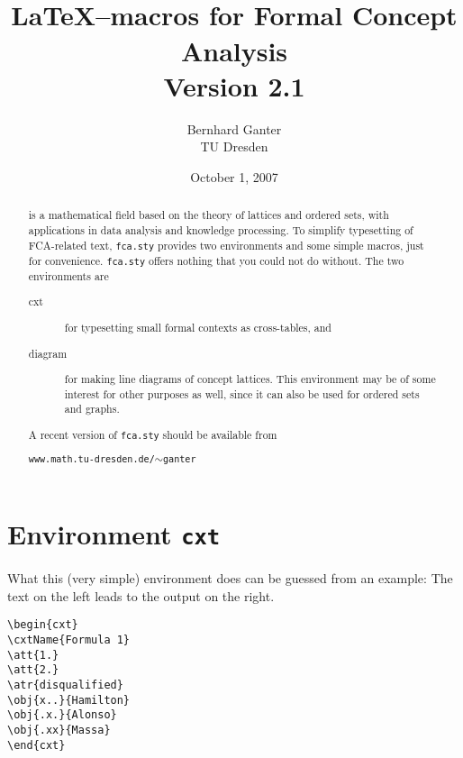 \documentclass[12pt]{article}
\title{\fcastyle\\\LaTeX--macros for Formal Concept Analysis\\
{ Version 2.1}}
\author{Bernhard Ganter\\ TU Dresden}
\date{October 1, 2007}
\def\fcastyle{\texttt{fca.sty}\xspace}
\begin{document}
\maketitle
\begin{abstract}
\FCA is a mathematical field based on the theory of lattices and ordered
sets, with applications in data analysis and knowledge processing. 
To simplify typesetting of FCA-related text, \fcastyle  provides two
environments and some simple macros, just for convenience. \fcastyle offers
nothing that you could not do without. The two environments are
\begin{description}
\item[cxt] for typesetting small formal contexts as cross-tables, and
\item [diagram] for making line diagrams of concept lattices. This environment
  may be of some interest for other purposes as well, since it can also be
  used for ordered sets and graphs.
\end{description}
A recent version of \texttt{fca.sty} should be available from
\begin{center}
  \texttt{www.math.tu-dresden.de/$\sim$ganter}
\end{center}
\end{abstract}
%
%
\tableofcontents

\section{Environment \texttt{cxt}}
What this (very simple) environment does can be guessed from an example:
The text on the left leads to the output on the right.\bigbreak

\noindent\begin{minipage}{.45\textwidth}
\begin{verbatim}
\begin{cxt}
\cxtName{Formula 1}
\att{1.}
\att{2.}
\atr{disqualified}
\obj{x..}{Hamilton}
\obj{.x.}{Alonso}
\obj{.xx}{Massa}
\end{cxt}
\end{verbatim}
\end{minipage}
\hfill
\begin{minipage}{.40\textwidth}
\begin{cxt}
\end{cxt}
\end{minipage}
\bigbreak
\end{document}
